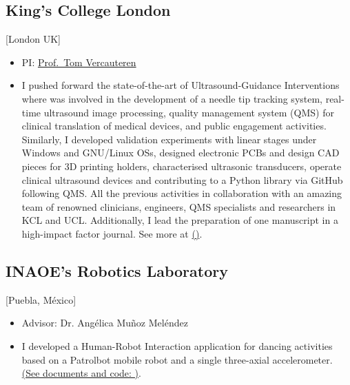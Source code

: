 \documentclass{mycv}
\begin{document}
\subsection{King's College London}[London UK]
\begin{positions}
\end{positions}
\begin{itemize}
  \item PI: \href{https://cai4cai.ml}{Prof.~Tom Vercauteren}
  \item I pushed forward the state-of-the-art of Ultrasound-Guidance Interventions
	where was involved in the development of a needle tip tracking system, real-time ultrasound image processing, 
	quality management system (QMS) for clinical translation of medical devices, and public engagement activities.
	Similarly, I developed validation experiments with linear stages under Windows and GNU/Linux OSs,
	designed electronic PCBs and design CAD pieces for 3D printing holders, characterised ultrasonic transducers,
    operate clinical ultrasound devices and contributing to a Python library via GitHub following QMS.
	All the previous activities in collaboration with an amazing 
	team of renowned clinicians, engineers, QMS specialists and researchers in KCL and UCL.
	Additionally, I lead the preparation of one manuscript in a high-impact factor journal.
	See more at \href{https://cai4cai.ml/author/miguel-xochicale/}{(\faExternalLink)}.
\end{itemize}

\newpage

\subsection{INAOE's Robotics Laboratory}[Puebla, M\'exico]
\begin{positions}
\end{positions}
\begin{itemize}
  \item Advisor: Dr. Ang\'elica Mu\~noz Mel\'endez
  \item I developed a Human-Robot Interaction application for dancing activities based on 
a Patrolbot mobile robot and a single three-axial accelerometer. 
\href{https://sites.google.com/site/perezxochicale/projects/demodance}{(See documents and code: \faExternalLink)}.
\end{itemize}
\end{document}
